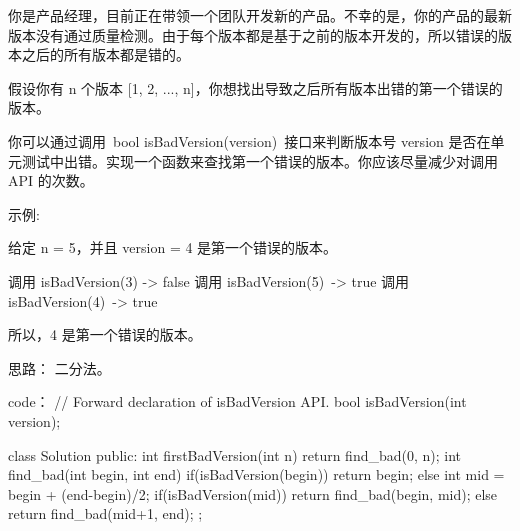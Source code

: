 你是产品经理，目前正在带领一个团队开发新的产品。不幸的是，你的产品的最新版本没有通过质量检测。由于每个版本都是基于之前的版本开发的，所以错误的版本之后的所有版本都是错的。

假设你有 n 个版本 [1, 2, ..., n]，你想找出导致之后所有版本出错的第一个错误的版本。

你可以通过调用 bool isBadVersion(version) 接口来判断版本号 version 是否在单元测试中出错。实现一个函数来查找第一个错误的版本。你应该尽量减少对调用 API 的次数。

示例:

给定 n = 5，并且 version = 4 是第一个错误的版本。

调用 isBadVersion(3) -> false
调用 isBadVersion(5) -> true
调用 isBadVersion(4) -> true

所以，4 是第一个错误的版本。 






















思路：
二分法。




















code：
// Forward declaration of isBadVersion API.
bool isBadVersion(int version);

class Solution {
public:
    int firstBadVersion(int n) {
        return find_bad(0, n);
    }
    int find_bad(int begin, int end)
    {
        if(isBadVersion(begin))
            return begin;
        else
        {
            int mid = begin + (end-begin)/2;
            if(isBadVersion(mid)) return find_bad(begin, mid);
            else return find_bad(mid+1, end);
        }
    }
};